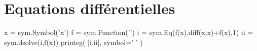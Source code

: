 \documentclass[12pt]{scrartcl}
\begin{document}
\section{Equations différentielles}
\begin{pyblock}
x = sym.Symbol('x')
f = sym.Function('')
i = sym.Eq(f(x).diff(x,x)+f(x),1)
ii = sym.dsolve(i,f(x))
printeg( [i,ii], symbol=' \qquad\Rightarrow\qquad ' )
\end{pyblock}
\printpythontex

\end{document}

